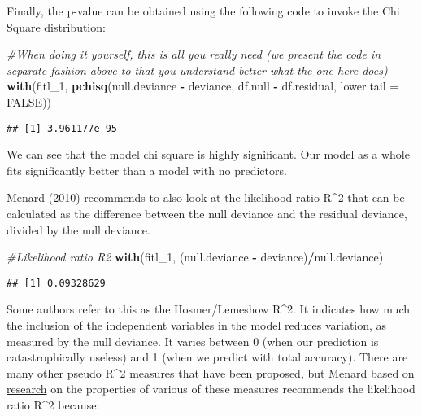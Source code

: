 \documentclass[
]{book}
\newenvironment{Shaded}{\begin{snugshade}}{\end{snugshade}}
\newcommand{\AttributeTok}[1]{\textcolor[rgb]{0.13,0.29,0.53}{#1}}
\newcommand{\CommentTok}[1]{\textcolor[rgb]{0.56,0.35,0.01}{\textit{#1}}}
\newcommand{\ConstantTok}[1]{\textcolor[rgb]{0.56,0.35,0.01}{#1}}
\newcommand{\FunctionTok}[1]{\textcolor[rgb]{0.13,0.29,0.53}{\textbf{#1}}}
\newcommand{\NormalTok}[1]{#1}
\newcommand{\SpecialCharTok}[1]{\textcolor[rgb]{0.81,0.36,0.00}{\textbf{#1}}}
\begin{document}
Finally, the p-value can be obtained using the following code to invoke the Chi Square distribution:

\begin{Shaded}
\begin{Highlighting}[]
\CommentTok{\#When doing it yourself, this is all you really need (we present the code in separate fashion above to that you understand better what the one here does)}
\FunctionTok{with}\NormalTok{(fitl\_1, }\FunctionTok{pchisq}\NormalTok{(null.deviance }\SpecialCharTok{{-}}\NormalTok{ deviance, df.null }\SpecialCharTok{{-}}\NormalTok{ df.residual, }\AttributeTok{lower.tail =} \ConstantTok{FALSE}\NormalTok{))}
\end{Highlighting}
\end{Shaded}

\begin{verbatim}
## [1] 3.961177e-95
\end{verbatim}

We can see that the model chi square is highly significant. Our model as a whole fits significantly better than a model with no predictors.

Menard (2010) recommends to also look at the likelihood ratio R\^{}2 that can be calculated as the difference between the null deviance and the residual deviance, divided by the null deviance.

\begin{Shaded}
\begin{Highlighting}[]
\CommentTok{\#Likelihood ratio R2}
\FunctionTok{with}\NormalTok{(fitl\_1, (null.deviance }\SpecialCharTok{{-}}\NormalTok{ deviance)}\SpecialCharTok{/}\NormalTok{null.deviance)}
\end{Highlighting}
\end{Shaded}

\begin{verbatim}
## [1] 0.09328629
\end{verbatim}

Some authors refer to this as the Hosmer/Lemeshow R\^{}2. It indicates how much the inclusion of the independent variables in the model reduces variation, as measured by the null deviance. It varies between 0 (when our prediction is catastrophically useless) and 1 (when we predict with total accuracy). There are many other pseudo R\^{}2 measures that have been proposed, but Menard \href{http://www.tandfonline.com/doi/pdf/10.1080/00031305.2000.10474502}{based on research} on the properties of various of these measures recommends the likelihood ratio R\^{}2 because:
\end{document}
